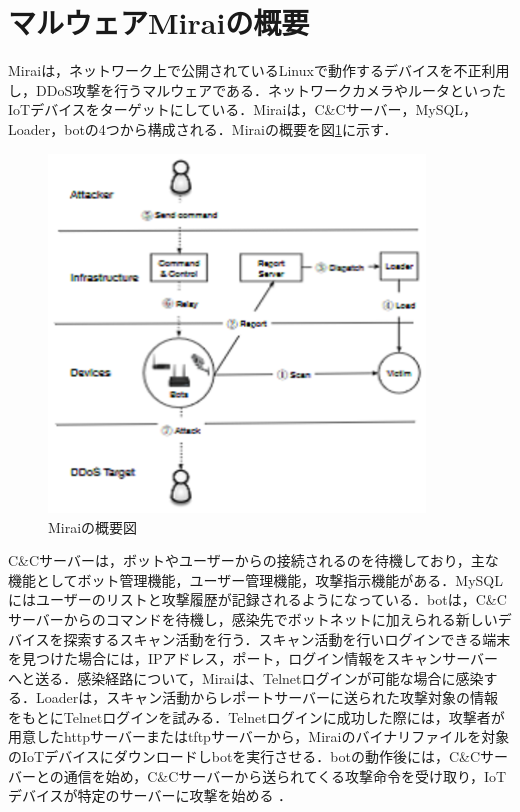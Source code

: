 \section{マルウェアMiraiの概要}

Mirai\cite{Mirai}は，ネットワーク上で公開されているLinuxで動作するデバイスを不正利用し，DDoS攻撃を行うマルウェアである．ネットワークカメラやルータといったIoTデバイスをターゲットにしている．Miraiは，C\&Cサーバー，MySQL，Loader，botの4つから構成される．Miraiの概要を図\ref{fig:Mirai_system}に示す．

\begin{figure}[h]
   \centering
      \includegraphics[width=100mm]{figures/s.eps}
      \caption{Miraiの概要図}
   \label{fig:Mirai_system}   
\end{figure}

C\&Cサーバーは，ボットやユーザーからの接続されるのを待機しており，主な機能としてボット管理機能，ユーザー管理機能，攻撃指示機能がある．MySQLにはユーザーのリストと攻撃履歴が記録されるようになっている．botは，C\&Cサーバーからのコマンドを待機し，感染先でボットネットに加えられる新しいデバイスを探索するスキャン活動を行う．スキャン活動を行いログインできる端末を見つけた場合には，IPアドレス，ポート，ログイン情報をスキャンサーバーへと送る．感染経路について，Miraiは、Telnetログインが可能な場合に感染する．Loaderは，スキャン活動からレポートサーバーに送られた攻撃対象の情報をもとにTelnetログインを試みる．Telnetログインに成功した際には，攻撃者が用意したhttpサーバーまたはtftpサーバーから，Miraiのバイナリファイルを対象のIoTデバイスにダウンロードしbotを実行させる．botの動作後には，C\&Cサーバーとの通信を始め，C\&Cサーバーから送られてくる攻撃命令を受け取り，IoTデバイスが特定のサーバーに攻撃を始める
．

